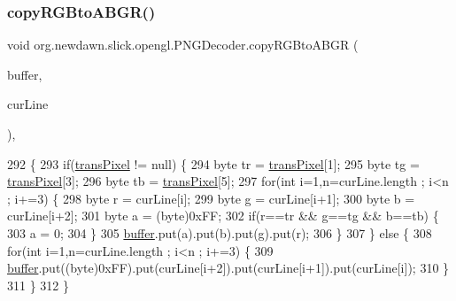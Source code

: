 \subsubsection{\texorpdfstring{copy\+R\+G\+Bto\+A\+B\+G\+R()}{copyRGBtoABGR()}}
{\footnotesize\ttfamily void org.\+newdawn.\+slick.\+opengl.\+P\+N\+G\+Decoder.\+copy\+R\+G\+Bto\+A\+B\+GR (\begin{DoxyParamCaption}\item[{Byte\+Buffer}]{buffer,  }\item[{byte \mbox{[}$\,$\mbox{]}}]{cur\+Line }\end{DoxyParamCaption})\hspace{0.3cm}{\ttfamily [inline]}, {\ttfamily [private]}}


\begin{DoxyCode}
292                                                                   \{
293         \textcolor{keywordflow}{if}(\mbox{\hyperlink{classorg_1_1newdawn_1_1slick_1_1opengl_1_1_p_n_g_decoder_ad3c546cf013c0c8bdee84a07fdc08389}{transPixel}} != null) \{
294             byte tr = \mbox{\hyperlink{classorg_1_1newdawn_1_1slick_1_1opengl_1_1_p_n_g_decoder_ad3c546cf013c0c8bdee84a07fdc08389}{transPixel}}[1];
295             byte tg = \mbox{\hyperlink{classorg_1_1newdawn_1_1slick_1_1opengl_1_1_p_n_g_decoder_ad3c546cf013c0c8bdee84a07fdc08389}{transPixel}}[3];
296             byte tb = \mbox{\hyperlink{classorg_1_1newdawn_1_1slick_1_1opengl_1_1_p_n_g_decoder_ad3c546cf013c0c8bdee84a07fdc08389}{transPixel}}[5];
297             \textcolor{keywordflow}{for}(\textcolor{keywordtype}{int} i=1,n=curLine.length ; i<n ; i+=3) \{
298                 byte r = curLine[i];
299                 byte g = curLine[i+1];
300                 byte b = curLine[i+2];
301                 byte a = (byte)0xFF;
302                 \textcolor{keywordflow}{if}(r==tr && g==tg && b==tb) \{
303                     a = 0;
304                 \}
305                 \mbox{\hyperlink{classorg_1_1newdawn_1_1slick_1_1opengl_1_1_p_n_g_decoder_ae205f9222586a2bc01a8a240c5c210ad}{buffer}}.put(a).put(b).put(g).put(r);
306             \}
307         \} \textcolor{keywordflow}{else} \{
308             \textcolor{keywordflow}{for}(\textcolor{keywordtype}{int} i=1,n=curLine.length ; i<n ; i+=3) \{
309                 \mbox{\hyperlink{classorg_1_1newdawn_1_1slick_1_1opengl_1_1_p_n_g_decoder_ae205f9222586a2bc01a8a240c5c210ad}{buffer}}.put((byte)0xFF).put(curLine[i+2]).put(curLine[i+1]).put(curLine[i]);
310             \}
311         \}
312     \}
\end{DoxyCode}
\mbox{\label{classorg_1_1newdawn_1_1slick_1_1opengl_1_1_p_n_g_decoder_ac2904e15dbda28288e3baf4b1354c6b7}} 
